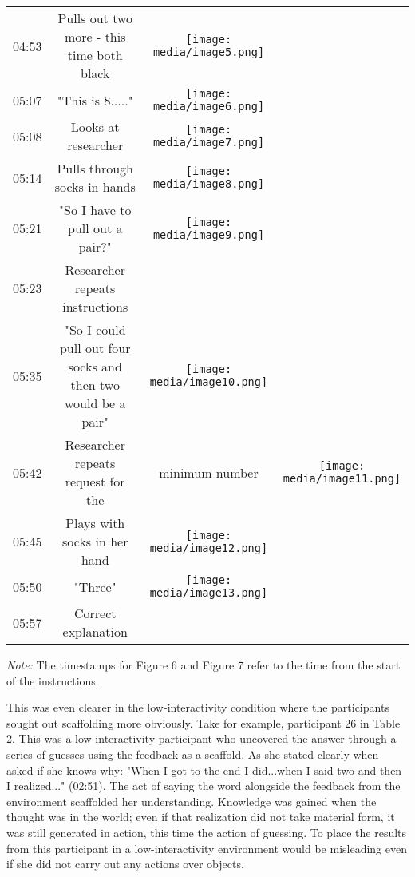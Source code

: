 \documentclass{article}
\begin{document}
\begin{table}

  
\begin{tabular}{c  c  c  c}

  04:53 & Pulls out two more - this time both black & \caption{}
\label{}
\texttt{[image: media/image5.png]}
\\
05:07 & "This is 8....." & \caption{}
\label{}
\texttt{[image: media/image6.png]}
\\
05:08 & Looks at researcher & \caption{}
\label{}
\texttt{[image: media/image7.png]}
\\
05:14 & Pulls through socks in hands & \caption{}
\label{}
\texttt{[image: media/image8.png]}
\\
05:21 & "So I have to pull out a pair?" & \caption{}
\label{}
\texttt{[image: media/image9.png]}
\\
05:23 & Researcher repeats instructions\\
05:35 & "So I could pull out four socks and then two would be a pair" & \caption{}
\label{}
\texttt{[image: media/image10.png]}
\\
05:42 & Researcher repeats request for the  & minimum number & \caption{}
\label{}
\texttt{[image: media/image11.png]}
\\
05:45 & Plays with socks in her hand & \caption{}
\label{}
\texttt{[image: media/image12.png]}
\\
05:50 & "Three" & \caption{}
\label{}
\texttt{[image: media/image13.png]}
\\
05:57 & Correct explanation\\


\end{tabular}


\end{table}
\emph{Note:} The timestamps for Figure 6 and Figure 7 refer to the time from the start of the instructions.

This was even clearer in the low-interactivity condition where the participants sought out scaffolding more obviously. Take for example, participant 26 in Table 2. This was a low-interactivity participant who uncovered the answer through a series of guesses using the feedback as a scaffold. As she stated clearly when asked if she knows why: "When I got to the end I did...when I said two and then I realized..." (02:51). The act of saying the word alongside the feedback from the environment scaffolded her understanding. Knowledge was gained when the thought was in the world; even if that realization did not take material form, it was still generated in action, this time the action of guessing. To place the results from this participant in a low-interactivity environment would be misleading even if she did not carry out any actions over objects. 
\end{document}
